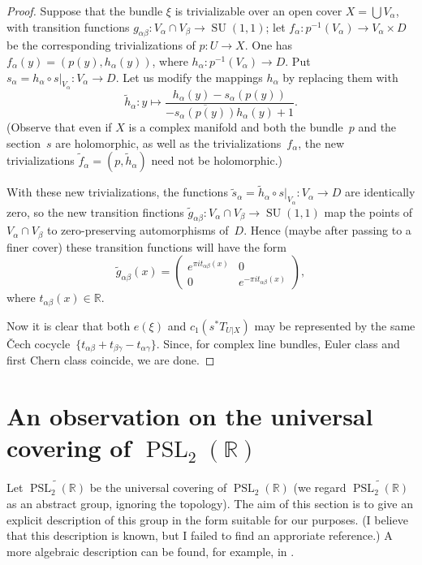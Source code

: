 \documentclass[11pt]{amsart}
\newcommand*{\R}{{\mathbb R}}
\newcommand*{\uPSL}{{\widetilde{\PSL_2(\R)}}}
\DeclareMathOperator{\PSL}{PSL}
\DeclareMathOperator{\SU}{SU}
\theoremstyle{remark}
\theoremstyle{definition}
\begin{document}
\begin{proof}
Suppose that the bundle $\xi$ is trivializable over an open cover
$X=\bigcup V_\alpha$, with transition functions $g_{\alpha\beta}\colon
V_\alpha\cap V_\beta\to\SU(1,1)$; let $f_\alpha\colon
p^{-1}(V_\alpha)\to V_\alpha\times D$ be the corresponding
trivializations of $p\colon U\to X$. One has
$f_\alpha(y)=(p(y),h_\alpha(y))$, where $h_\alpha\colon
p^{-1}(V_\alpha)\to D$. Put $s_\alpha=h_\alpha\circ
s|_{V_\alpha}\colon V_\alpha\to D$.  Let us modify the mappings
$h_\alpha$ by replacing them with
\begin{equation*}
  \tilde h_\alpha\colon y\mapsto 
  \frac{h_\alpha(y)-s_\alpha(p(y))}
       {-\overline{s_\alpha(p(y))}h_\alpha(y)+1}.
\end{equation*}
(Observe that even if $X$ is a complex manifold and both the
bundle~$p$ and the section~$s$ are holomorphic, as well as the
trivializations~$f_\alpha$, the new trivializations $\tilde
f_\alpha=(p,\tilde h_\alpha)$ need not be holomorphic.)

With these new trivializations, the functions $\tilde s_\alpha=\tilde
h_\alpha\circ s|_{V_\alpha}\colon V_\alpha\to D$ are identically zero,
so the new transition finctions $\tilde g_{\alpha\beta}\colon
V_\alpha\cap V_\beta\to \SU(1,1)$ map the points of $V_\alpha\cap
V_\beta$ to zero-preserving automorphisms of~$D$. Hence
(maybe after passing to a
finer cover) these transition functions will have the form
\begin{equation*}
\tilde g_{\alpha\beta}(x)=
\begin{pmatrix}
  e^{\pi it_{\alpha\beta}(x)} & 0 \\
  0 & e^{-\pi it_{\alpha\beta}(x)}
\end{pmatrix},
\end{equation*}
where $t_{\alpha\beta}(x)\in\R$.

Now it is clear that both $e(\xi)$ and $c_1(s^*T_{U|X})$ may be
represented by the same \v{C}ech
cocycle~$\{t_{\alpha\beta}+t_{\beta\gamma}-t_{\alpha\gamma}\}$. Since,
for complex line bundles, Euler class and first Chern class coincide,
we are done.
\end{proof}

\section{An observation on the universal covering of
  $\PSL_2(\R)$}

Let $\uPSL$ be the universal covering of $\PSL_2(\R)$ (we regard
$\uPSL$ as an abstract group, ignoring the topology).  The aim of this
section is to give an explicit description of this group in the form
suitable for our purposes. (I believe that this description is known,
but I failed to find an approriate reference.) A more algebraic
description can be found, for example, in \cite[Section 6]{Rawnsley}.
\end{document}
